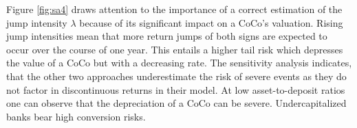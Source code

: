 Figure \ref{fig:sa4} draws attention to the importance of a correct estimation of the jump intensity $\lambda$ because of its significant impact on a CoCo's valuation. Rising jump intensities mean that more return jumps of both signs are expected to occur over the course of one year. This entails a higher tail risk which depresses the value of a CoCo but with a decreasing rate. The sensitivity analysis indicates, that the other two approaches underestimate the risk of severe events as they do not factor in discontinuous returns in their model. At low asset-to-deposit ratios one can observe that the depreciation of a CoCo can be severe. Undercapitalized banks bear high conversion risks.
 
  
  

